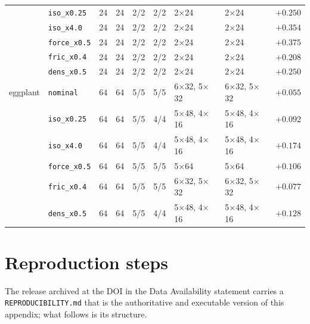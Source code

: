 \documentclass[pdflatex,iicol,sn-apa]{sn-jnl}
\theoremstyle{remark}
\begin{document}
\begin{appendices}
\begin{table}[t]
\begin{tabular}{@{}llrrlllll@{}}
 & \texttt{iso\_x0.25} & 24 & 24 & 2/2 & 2/2 & 2$\times$24 & 2$\times$24 & $+0.250$ \\
 & \texttt{iso\_x4.0} & 24 & 24 & 2/2 & 2/2 & 2$\times$24 & 2$\times$24 & $+0.354$ \\
 & \texttt{force\_x0.5} & 24 & 24 & 2/2 & 2/2 & 2$\times$24 & 2$\times$24 & $+0.375$ \\
 & \texttt{fric\_x0.4} & 24 & 24 & 2/2 & 2/2 & 2$\times$24 & 2$\times$24 & $+0.208$ \\
 & \texttt{dens\_x0.5} & 24 & 24 & 2/2 & 2/2 & 2$\times$24 & 2$\times$24 & $+0.250$ \\
\midrule
eggplant & \texttt{nominal} & 64 & 64 & 5/5 & 5/5 & 6$\times$32, 5$\times$32 & 6$\times$32, 5$\times$32 & $+0.055$ \\
 & \texttt{iso\_x0.25} & 64 & 64 & 5/5 & 4/4 & 5$\times$48, 4$\times$16 & 5$\times$48, 4$\times$16 & $+0.092$ \\
 & \texttt{iso\_x4.0} & 64 & 64 & 5/5 & 4/4 & 5$\times$48, 4$\times$16 & 5$\times$48, 4$\times$16 & $+0.174$ \\
 & \texttt{force\_x0.5} & 64 & 64 & 5/5 & 5/5 & 5$\times$64 & 5$\times$64 & $+0.106$ \\
 & \texttt{fric\_x0.4} & 64 & 64 & 5/5 & 5/5 & 6$\times$32, 5$\times$32 & 6$\times$32, 5$\times$32 & $+0.077$ \\
 & \texttt{dens\_x0.5} & 64 & 64 & 5/5 & 4/4 & 5$\times$48, 4$\times$16 & 5$\times$48, 4$\times$16 & $+0.128$ \\
\bottomrule
\end{tabular}
\end{table}

\section{Reproduction steps}\label{secD}

The release archived at the DOI in the Data Availability statement carries a
\texttt{REPRODUCIBILITY.md} that is the authoritative and executable version of this appendix; what
follows is its structure.


\end{appendices}
\end{document}
